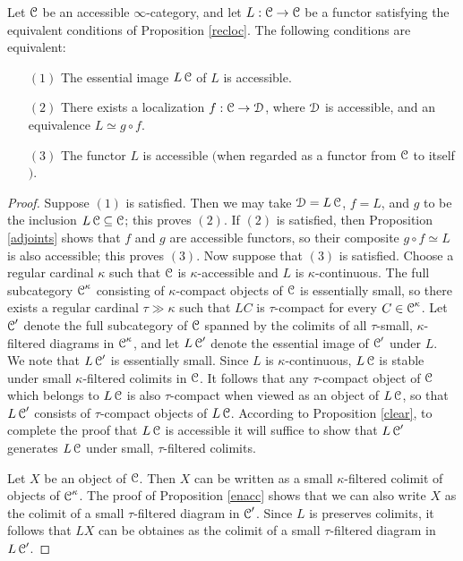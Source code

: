 \begin{proposition}\label{accloc}
Let $\operatorname{\mathcal{C}}$ be an accessible $\infty$-category, and let $L: \operatorname{\mathcal{C}} \rightarrow \operatorname{\mathcal{C}}$ be a functor satisfying the equivalent conditions of Proposition \ref{recloc}. The following conditions are equivalent:
\begin{itemize}
\item[$(1)$] The essential image $L \operatorname{\mathcal{C}}$ of $L$ is accessible.
\item[$(2)$] There exists a localization $f: \operatorname{\mathcal{C}} \rightarrow \operatorname{\mathcal{D}}$, where $\operatorname{\mathcal{D}}$ is accessible,
and an equivalence $L \simeq g \circ f$.
\item[$(3)$] The functor $L$ is accessible $($when regarded as a functor from $\operatorname{\mathcal{C}}$ to itself$)$.
\end{itemize}
\end{proposition}

\begin{proof}
Suppose $(1)$ is satisfied. Then we may take $\operatorname{\mathcal{D}} = L\operatorname{\mathcal{C}}$, $f = L$, and $g$ to be the inclusion $L\operatorname{\mathcal{C}} \subseteq \operatorname{\mathcal{C}}$; this proves $(2)$. If $(2)$ is satisfied, then Proposition \ref{adjoints} shows that $f$ and $g$ are accessible functors, so their composite $g \circ f \simeq L$ is
also accessible; this proves $(3)$. Now suppose that $(3)$ is satisfied. Choose a regular
cardinal $\kappa$ such that $\operatorname{\mathcal{C}}$ is $\kappa$-accessible and $L$ is $\kappa$-continuous.
The full subcategory $\operatorname{\mathcal{C}}^{\kappa}$ consisting of $\kappa$-compact objects of
$\operatorname{\mathcal{C}}$ is essentially small, so there exists a regular cardinal $\tau \gg \kappa$ such that
$LC$ is $\tau$-compact for every $C \in \operatorname{\mathcal{C}}^{\kappa}$. Let $\operatorname{\mathcal{C}}'$ denote the full subcategory of $\operatorname{\mathcal{C}}$ spanned by the colimits of all $\tau$-small, $\kappa$-filtered diagrams in $\operatorname{\mathcal{C}}^{\kappa}$, and let $L\operatorname{\mathcal{C}}'$ denote the essential image of $\operatorname{\mathcal{C}}'$ under $L$. We note that
$L\operatorname{\mathcal{C}}'$ is essentially small. Since $L$ is $\kappa$-continuous, $L \operatorname{\mathcal{C}}$ is stable under
small $\kappa$-filtered colimits in $\operatorname{\mathcal{C}}$. It follows that any $\tau$-compact object
of $\operatorname{\mathcal{C}}$ which belongs to $L \operatorname{\mathcal{C}}$ is also $\tau$-compact when viewed as an object
of $L \operatorname{\mathcal{C}}$, so that $L \operatorname{\mathcal{C}}'$ consists of $\tau$-compact objects of $L \operatorname{\mathcal{C}}$. According to Proposition \ref{clear}, to complete the proof that $L \operatorname{\mathcal{C}}$ is accessible it will suffice to
show that $L \operatorname{\mathcal{C}}'$ generates $L \operatorname{\mathcal{C}}$ under small, $\tau$-filtered colimits.

Let $X$ be an object of $\operatorname{\mathcal{C}}$. Then $X$ can be written as a small $\kappa$-filtered
colimit of objects of $\operatorname{\mathcal{C}}^{\kappa}$. The proof of Proposition \ref{enacc} shows that
we can also write $X$ as the colimit of a small $\tau$-filtered diagram in $\operatorname{\mathcal{C}}'$.
Since $L$ is preserves colimits, it follows that $LX$ can be obtaines as the colimit of a small $\tau$-filtered diagram in $L \operatorname{\mathcal{C}}'$.
\end{proof}

